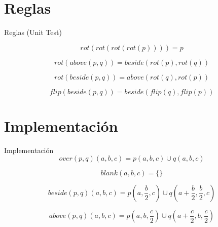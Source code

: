 \documentclass{beamer}
\begin{document}
    \section{Reglas}

    \begin{frame}{Reglas (Unit Test)}

        \begin{equation*}
        rot(rot(rot(rot(p)))) = p
        \end{equation*}

        \begin{equation*}
        rot(above(p, q)) = beside(rot(p), rot(q))
        \end{equation*}

        \begin{equation*}
        rot(beside(p, q)) = above(rot(q), rot(p))
        \end{equation*}

        \begin{equation*}
        flip(beside(p, q)) = beside(flip(q), flip(p))
        \end{equation*}
    \end{frame}

    \section{Implementación}

    \begin{frame}{Implementación}
        \begin{equation*}
        over(p, q)(a, b, c) = p(a, b, c) \cup q(a, b, c)
        \end{equation*}

        \begin{equation*}
        blank(a, b, c) = \text{\{\}}
        \end{equation*}

        \begin{equation*}
        beside(p, q)(a, b, c) = p(a, \frac{b}{2}, c) \cup q(a + \frac{b}{2}, \frac{b}{2}, c)
        \end{equation*}

        \begin{equation*}
        above(p, q)(a, b, c) = p(a, b, \frac{c}{2}) \cup q (a + \frac{c}{2}, b, \frac{c}{2})
        \end{equation*}
    \end{frame}
\end{document}
